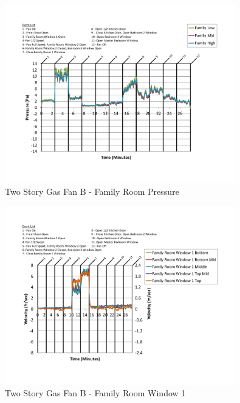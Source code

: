 \documentclass{article}
\begin{document}
\begin{appendices}
	\begin{figure}[H]
		\centering
		\includegraphics[height=3.05in,trim=0.67in 1.1in 0.67in 0.8in,clip=true]{0_Images/Results_Charts/ColdFlow/Two_Story/Gas/B/Family_Room_Pressure.pdf}
		\caption{Two Story Gas Fan B - Family Room Pressure}
	\end{figure}
 

	\begin{figure}[H]
		\centering
		\includegraphics[height=3.05in,trim=0.67in 1.1in 0.67in 0.8in,clip=true]{0_Images/Results_Charts/ColdFlow/Two_Story/Gas/B/Family_Room_Window_1.pdf}
		\caption{Two Story Gas Fan B - Family Room Window 1}
	\end{figure}
 
	\clearpage


\end{appendices}
\end{document}
